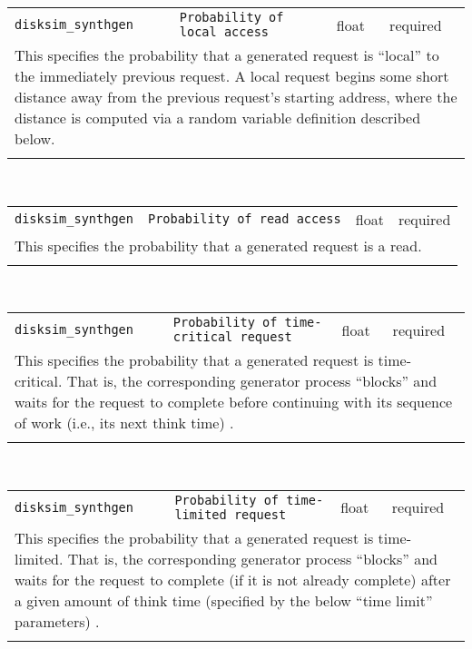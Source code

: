 \noindent 
\begin{tabular}{|p{\lpmodwidth}|p{\lpnamewidth}|p{0.5in}|p{0.5in}|}
\cline{1-4}
\texttt{disksim\_synthgen} & \texttt{Probability of local access} & float & required \\ 
\cline{1-4}
\multicolumn{4}{|p{6in}|}{
This specifies the probability that a generated request is ``local'' to
the immediately previous request. A local request begins some short
distance away from the previous request's starting address, where the
distance is computed via a random variable definition described below.
}\\ 
\cline{1-4}
\multicolumn{4}{p{5in}}{}\\
\end{tabular}\\ 
\noindent 
\begin{tabular}{|p{\lpmodwidth}|p{\lpnamewidth}|p{0.5in}|p{0.5in}|}
\cline{1-4}
\texttt{disksim\_synthgen} & \texttt{Probability of read access} & float & required \\ 
\cline{1-4}
\multicolumn{4}{|p{6in}|}{
This specifies the probability that a generated request is a read.
}\\ 
\cline{1-4}
\multicolumn{4}{p{5in}}{}\\
\end{tabular}\\ 
\noindent 
\begin{tabular}{|p{\lpmodwidth}|p{\lpnamewidth}|p{0.5in}|p{0.5in}|}
\cline{1-4}
\texttt{disksim\_synthgen} & \texttt{Probability of time-critical request} & float & required \\ 
\cline{1-4}
\multicolumn{4}{|p{6in}|}{
This specifies the probability that a generated request is time-critical.
That is, the corresponding generator process ``blocks'' and waits for
the request to complete before continuing with its sequence of work
(i.e., its next think time) \cite{Ganger93,Ganger95}.
}\\ 
\cline{1-4}
\multicolumn{4}{p{5in}}{}\\
\end{tabular}\\ 
\noindent 
\begin{tabular}{|p{\lpmodwidth}|p{\lpnamewidth}|p{0.5in}|p{0.5in}|}
\cline{1-4}
\texttt{disksim\_synthgen} & \texttt{Probability of time-limited request} & float & required \\ 
\cline{1-4}
\multicolumn{4}{|p{6in}|}{
This specifies the probability that a generated request is
time-limited. That is, the corresponding generator process ``blocks''
and waits for the request to complete (if it is not already complete)
after a given amount of think time (specified by the below ``time
limit'' parameters) \cite{Ganger93,Ganger95}.
}\\ 
\cline{1-4}
\multicolumn{4}{p{5in}}{}\\
\end{tabular}\\ 
